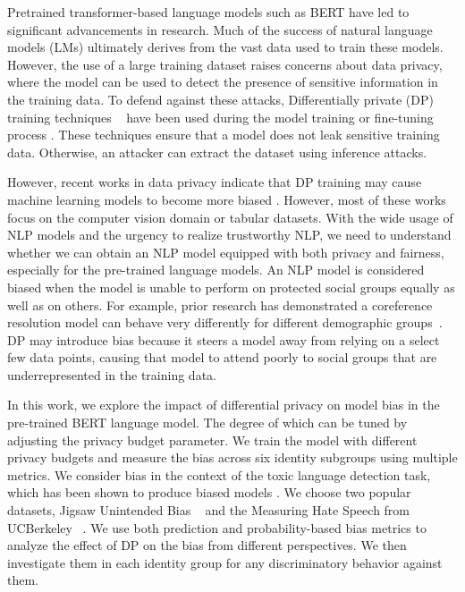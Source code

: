 \documentclass[11pt]{article} %
\begin{document}
Pretrained transformer-based language models such as BERT \cite{devlin-etal-2019-bert} have led to significant advancements in research. Much of the success of natural language models (LMs) ultimately derives from the vast data used to train these models. However, the use of a large training dataset raises concerns about data privacy, where the model can be used to detect the presence of sensitive information in the training data. To defend against these attacks, Differentially private (DP) training techniques ~\cite{dwork2006calibrating,abadi2016deep} have been used during the model training or fine-tuning process \cite{yu2021differentially}. These techniques ensure that a model does not leak sensitive training data. Otherwise, an attacker can extract the dataset \cite{carlini2021extracting} using inference attacks.

However, recent works in data privacy indicate that DP training may cause machine learning models to become more biased \citep{cummingsfairness, bagdasaryan-fairness, imageanalysisfairness}. However, most of these works focus on the computer vision domain or tabular datasets. With the wide usage of NLP models and the urgency to realize trustworthy NLP, we need to understand whether we can obtain an NLP model equipped with both privacy and fairness, especially for the pre-trained language models. An NLP model is considered biased when the model is unable to perform on protected social groups equally as well as on others. For example, prior research has demonstrated a coreference resolution model can behave very differently for different demographic groups~\cite{zhao2018gender,rudinger2018gender}. DP may introduce bias because it steers a model away from relying on a select few data points, causing that model to attend poorly to social groups that are underrepresented in the training data. 

In this work, we explore the impact of differential privacy on model bias in the pre-trained BERT language model. The degree of which can be tuned by adjusting the privacy budget parameter. We train the model with different privacy budgets and measure the bias across six identity subgroups using multiple metrics. We consider bias in the context of the toxic language detection task, which has been shown to produce biased models \cite{davidson-etal-2019-racial}. We choose two popular datasets, Jigsaw Unintended Bias ~\cite{borkan2019nuanced} and the  Measuring Hate Speech from UCBerkeley ~\cite{kennedy2020constructing}. We use both prediction and probability-based bias metrics to analyze the effect of DP on the bias from different perspectives. We then investigate them in each identity group for any discriminatory behavior against them.
\end{document}
